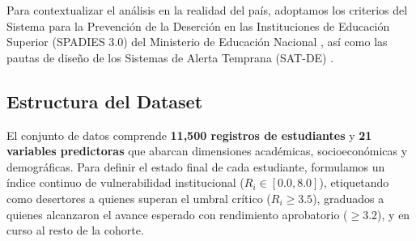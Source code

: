 \documentclass[12pt,a4paper]{article}
\begin{document}
Para contextualizar el análisis en la realidad del país, adoptamos los criterios del Sistema para la Prevención de la Deserción en las Instituciones de Educación Superior (SPADIES 3.0) del Ministerio de Educación Nacional \cite{mineducacion2024}, así como las pautas de diseño de los Sistemas de Alerta Temprana (SAT-DE) \cite{penapico2024}.

\subsection{Estructura del Dataset}
El conjunto de datos comprende \textbf{11,500 registros de estudiantes} y \textbf{21 variables predictoras} que abarcan dimensiones académicas, socioeconómicas y demográficas. Para definir el estado final de cada estudiante, formulamos un índice continuo de vulnerabilidad institucional ($R_i \in [0.0, 8.0]$), etiquetando como desertores a quienes superan el umbral crítico ($R_i \ge 3.5$), graduados a quienes alcanzaron el avance esperado con rendimiento aprobatorio ($\ge 3.2$), y en curso al resto de la cohorte.
\end{document}
